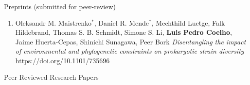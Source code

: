 \documentclass{article}
\renewcommand\subsection[1]{%
    \par\vspace{.1em}%
    {\hspace{1em}\subsubhead #1}%
    \par\vspace{.2em}%
}
\newcommand\costar{${}^{*}$}
\begin{document}
\medskip
\medskip

\subsection{Preprints (submitted for peer-review)}
\Text

\begin{enumerate}[resume]
\item Oleksandr M. Maistrenko\costar,  Daniel R. Mende\costar,  Mechthild
Luetge, Falk Hildebrand,  Thomas S. B. Schmidt,  Simone S. Li, \textbf{Luis
Pedro Coelho},  Jaime Huerta-Cepas,  Shinichi Sunagawa,  Peer Bork
\emph{Disentangling the impact of environmental and phylogenetic constraints on
prokaryotic strain diversity} \href{biorXiv
2019}{https://doi.org/10.1101/735696}

\end{enumerate}

\subsection{Peer-Reviewed Research Papers}
\end{document}
